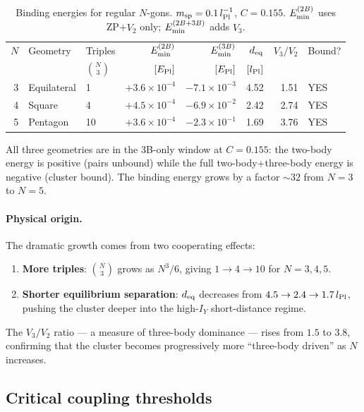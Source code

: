\begin{table}[h]
\centering
\caption{Binding energies for regular $N$-gons.
$m_{\rm sp}=0.1\,l_{\rm Pl}^{-1}$, $C=0.155$.
$E_{\rm min}^{(2B)}$ uses ZP+$V_2$ only; $E_{\rm min}^{(2B+3B)}$ adds $V_3$.}
\label{tab:polygon_binding}
\begin{tabular}{rllrrrrl}
\hline
$N$ & Geometry & Triples & $E_{\rm min}^{(2B)}$ & $E_{\rm min}^{(3B)}$
    & $d_{\rm eq}$ & $V_3/V_2$ & Bound? \\
    &          & $\binom{N}{3}$ & $[E_{\rm Pl}]$ & $[E_{\rm Pl}]$
    & $[l_{\rm Pl}]$ & & \\
\hline
3 & Equilateral & 1  & $+3.6\times10^{-4}$ & $-7.1\times10^{-3}$ & 4.52 & 1.51 & YES \\
4 & Square      & 4  & $+4.5\times10^{-4}$ & $-6.9\times10^{-2}$ & 2.42 & 2.74 & YES \\
5 & Pentagon    & 10 & $+3.6\times10^{-4}$ & $-2.3\times10^{-1}$ & 1.69 & 3.76 & YES \\
\hline
\end{tabular}
\end{table}

All three geometries are in the 3B-only window at $C=0.155$: the
two-body energy is positive (pairs unbound) while the full
two-body+three-body energy is negative (cluster bound).  The binding
energy grows by a factor $\sim32$ from $N=3$ to $N=5$.

\paragraph{Physical origin.}
The dramatic growth comes from two cooperating effects:
\begin{enumerate}
\item \textbf{More triples}: $\binom{N}{3}$ grows as $N^3/6$, giving
  $1\to4\to10$ for $N=3,4,5$.
\item \textbf{Shorter equilibrium separation}: $d_{\rm eq}$ decreases from
  $4.5\to2.4\to1.7\,l_{\rm Pl}$, pushing the cluster deeper into the
  high-$I_Y$ short-distance regime.
\end{enumerate}
The $V_3/V_2$ ratio — a measure of three-body dominance — rises from
$1.5$ to $3.8$, confirming that the cluster becomes progressively more
``three-body driven'' as $N$ increases.

\subsection{Critical coupling thresholds}

